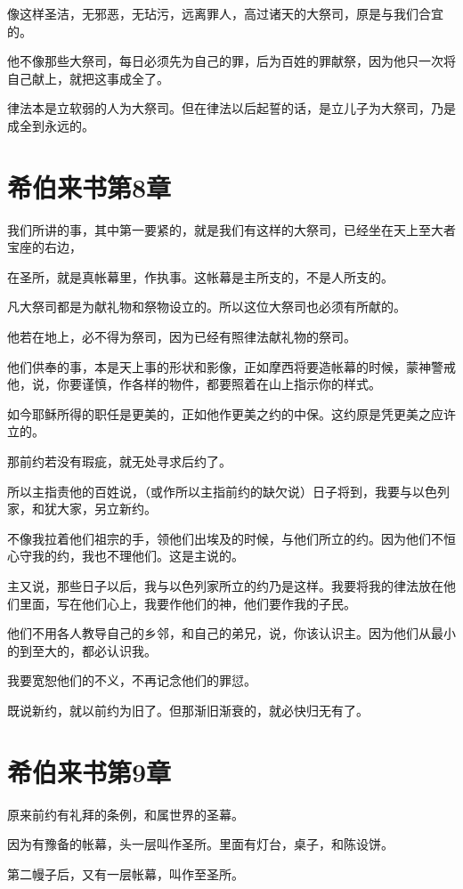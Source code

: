 \documentclass[12pt,oneside]{book}
\begin{document}
像这样圣洁，无邪恶，无玷污，远离罪人，高过诸天的大祭司，原是与我们合宜的。

他不像那些大祭司，每日必须先为自己的罪，后为百姓的罪献祭，因为他只一次将自己献上，就把这事成全了。

律法本是立软弱的人为大祭司。但在律法以后起誓的话，是立儿子为大祭司，乃是成全到永远的。

\chapter{希伯来书第8章}
我们所讲的事，其中第一要紧的，就是我们有这样的大祭司，已经坐在天上至大者宝座的右边，

在圣所，就是真帐幕里，作执事。这帐幕是主所支的，不是人所支的。

凡大祭司都是为献礼物和祭物设立的。所以这位大祭司也必须有所献的。

他若在地上，必不得为祭司，因为已经有照律法献礼物的祭司。

他们供奉的事，本是天上事的形状和影像，正如摩西将要造帐幕的时候，蒙神警戒他，说，你要谨慎，作各样的物件，都要照着在山上指示你的样式。

如今耶稣所得的职任是更美的，正如他作更美之约的中保。这约原是凭更美之应许立的。

那前约若没有瑕疵，就无处寻求后约了。

所以主指责他的百姓说，（或作所以主指前约的缺欠说）日子将到，我要与以色列家，和犹大家，另立新约。

不像我拉着他们祖宗的手，领他们出埃及的时候，与他们所立的约。因为他们不恒心守我的约，我也不理他们。这是主说的。

主又说，那些日子以后，我与以色列家所立的约乃是这样。我要将我的律法放在他们里面，写在他们心上，我要作他们的神，他们要作我的子民。

他们不用各人教导自己的乡邻，和自己的弟兄，说，你该认识主。因为他们从最小的到至大的，都必认识我。

我要宽恕他们的不义，不再记念他们的罪愆。

既说新约，就以前约为旧了。但那渐旧渐衰的，就必快归无有了。

\chapter{希伯来书第9章}
原来前约有礼拜的条例，和属世界的圣幕。

因为有豫备的帐幕，头一层叫作圣所。里面有灯台，桌子，和陈设饼。

第二幔子后，又有一层帐幕，叫作至圣所。
\end{document}

